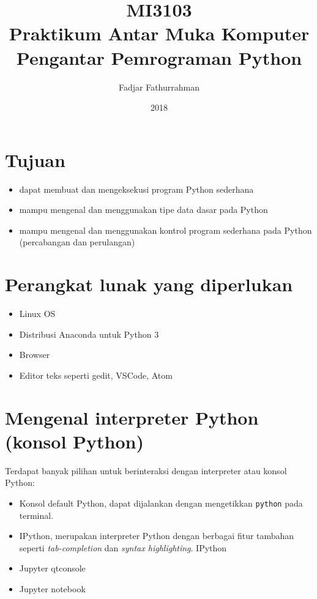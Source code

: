 \documentclass[a4paper,11pt]{extarticle}
\title{
MI3103 \\
Praktikum Antar Muka Komputer\\
Pengantar Pemrograman Python}
\author{Fadjar Fathurrahman}
\date{2018}
\begin{document}
\maketitle

\section{Tujuan}
\begin{itemize}
\item dapat membuat dan mengeksekusi program Python sederhana
\item mampu mengenal dan menggunakan tipe data dasar pada Python
\item mampu mengenal dan menggunakan kontrol program sederhana pada Python (percabangan dan
perulangan)
\end{itemize}

\section{Perangkat lunak yang diperlukan}
\begin{itemize}
\item Linux OS
\item Distribusi Anaconda untuk Python 3
\item Browser
\item Editor teks seperti \textsf{gedit}, \textsf{VSCode}, \textsf{Atom}
\end{itemize}


\section{Mengenal interpreter Python (konsol Python)}

Terdapat banyak pilihan untuk berinteraksi dengan interpreter 
atau konsol Python:
\begin{itemize}
\item Konsol default Python, dapat dijalankan dengan mengetikkan
\texttt{python} pada terminal.
\item IPython, merupakan interpreter Python dengan berbagai fitur tambahan
seperti \textit{tab-completion} dan \textit{syntax highlighting}.
IPython 
\item Jupyter qtconsole
\item Jupyter notebook
\end{itemize}
\end{document}
